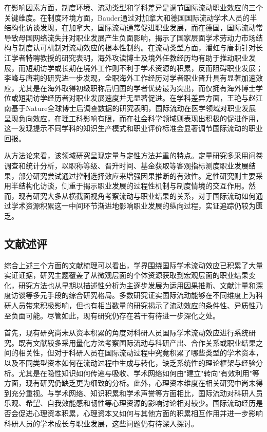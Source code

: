 在影响因素方面，制度环境、流动类型和学科差异是调节国际流动职业效应的三个关键维度。在制度环境方面，Bauder通过对加拿大和德国国际流动学术人员的半结构化访谈发现，在加拿大，国际流动通常促进职业发展，而在德国，国际流动常导致母国网络流失并对职业发展产生负面影响，揭示了国家层面学术劳动力市场结构与制度认可机制对流动效应的根本性制约\cite{bauder2020}。在流动类型方面，潘虹与唐莉针对长江学者特聘教授的研究表明，海外攻读博士及境外任教经历均有助于推动职业发展，而短期访学或长期在境外工作则不利于学术资源的积累，反而阻碍职业发展\cite{panhong2023}；李峰与唐莉的研究进一步发现，全职海外工作经历对学者职业晋升具有显著加速效应，尤其是在海外取得初级职称后归国的学者优势最为突出，而仅拥有海外博士学位或短期访学经历者对职业发展速度并无显著促进\cite{lifeng2022}。在学科差异方面，王艳与赵江南基于Nature全球博士后调查数据的研究表明，国际流动在医学领域对职业发展呈现负向效应，在理工科影响有限，而在社会科学领域则表现出积极的促进作用，这一发现提示不同学科的知识生产模式和职业评价标准会显著调节国际流动的职业回报\cite{wangyan2026}。

从方法论来看，该领域研究呈现定量与定性方法并重的特点。定量研究多采用问卷调查和统计分析，以职称等级、晋升时间、基金获取等客观指标测度职业发展结果，部分研究尝试通过控制选择效应来增强因果推断的有效性。定性研究则主要采用半结构化访谈，侧重于揭示职业发展的过程性机制与制度情境的交互作用。然而，现有研究大多从横截面视角考察流动与职业结果的关系，对于国际流动如何通过学术资源积累这一中间环节渐进地影响职业发展的纵向过程，实证追踪仍较为匮乏。

\subsection{文献述评}

综合上述三个方面的文献梳理可以看出，学界围绕国际学术流动效应已积累了大量实证证据，研究主题覆盖了从微观层面的个体资源获取到宏观层面的职业结果变化，研究方法也从早期以描述性分析为主逐步发展为运用因果推断、文献计量和深度访谈等多元手段的综合研究格局。多数研究证实国际流动能够在不同维度上为科研人员带来积极影响，但也有相当数量的研究揭示了流动效应的条件性、异质性乃至负面可能。尽管如此，现有研究仍存在若干有待进一步深化之处。

首先，现有研究尚未从资本积累的角度对科研人员国际学术流动效应进行系统研究。既有文献较多采用量化方法考察国际流动与科研产出、合作关系或职业结果之间的相关性，但对于科研人员在国际流动过程中究竟积累了哪些类型的学术资本，以及不同类型资本如何在流动过程中生成与转化，缺乏系统性的理论框架与经验分析。尤其是在隐性知识如何传递与吸收、学术网络如何由"建立"转向"有效利用"等方面，现有研究仍缺乏更为细致的分析。此外，心理资本维度在相关研究中尚未得到充分重视。与学术网络、知识积累和学术声誉等方面相比，国际流动对科研人员乐观、希望、自我效能感和韧性等心理资源的影响讨论相对较少。国际流动经历是否会促进心理资本积累，心理资本又如何与其他方面的积累相互作用并进一步影响科研人员的学术成长与职业发展，这些问题仍有待深入探讨。

